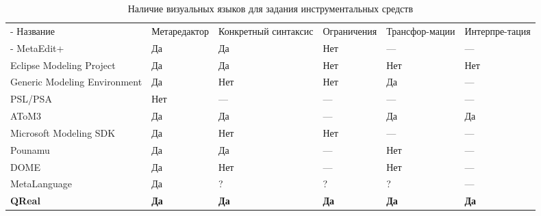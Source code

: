 \begin{table}[ht]
\begin{small}
	\begin{longtabu} {| X[1 l p] | X[1 l p] | X[1 l p] | X[1 l p] | X[1 l p] | X[1 l p] |}
		\caption{Наличие визуальных языков для задания инструментальных средств} \\
		\tabucline-
		 Название                    & Метаредактор & Конкретный синтаксис & Ограничения & Трансфор-мации & Интерпре-тация \\
		\tabucline-
		\everyrow{\tabucline-}
		MetaEdit+                    & Да           & Да                   & Нет         & ---           & ---           \\
		Eclipse Modeling Project     & Да           & Да                   & Нет         & Нет           & Нет           \\
		Generic Modeling Environment & Да           & Нет                  & Нет         & Да            & ---           \\
		PSL/PSA                      & Нет          & ---                  & ---         & ---           & ---           \\
		AToM3                        & Да           & Да                   & ---         & Да            & Да            \\
		Microsoft Modeling SDK       & Да           & Нет                  & Нет         & ---           & ---           \\
		Pounamu                      & Да           & Да                   & ---         & Нет           & ---           \\
		DOME                         & Да           & Нет                  & ---         & Нет           & ---           \\
		MetaLanguage                 & Да           & ?                    & ?           & ?             & ---           \\
		\textbf{QReal}               & \textbf{Да}  & \textbf{Да}          & \textbf{Да} & \textbf{Да}   & \textbf{Да}
		\label{tab:existingPlatformsCondensed}
	\end{longtabu}
\end{small}
\end{table}

